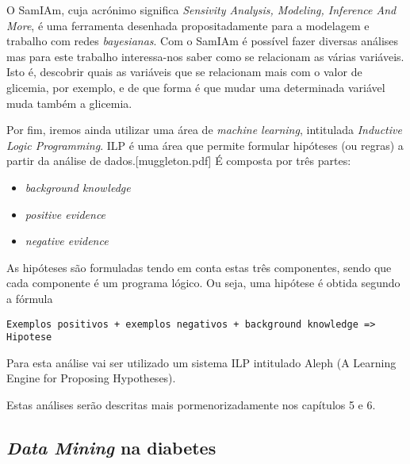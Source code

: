 O SamIAm, cuja acrónimo significa \textit{Sensivity Analysis, Modeling, Inference And More}, é uma ferramenta desenhada propositadamente para a modelagem e trabalho com redes \textit{bayesianas}. Com o SamIAm é possível fazer diversas análises mas para este trabalho interessa-nos saber como se relacionam as várias variáveis. Isto é, descobrir quais as variáveis que se relacionam mais com o valor de glicemia, por exemplo, e de que forma é que mudar uma determinada variável muda também a glicemia.

Por fim, iremos ainda utilizar uma área de \textit{machine learning}, intitulada \textit{Inductive Logic Programming}. ILP é uma área que permite formular hipóteses (ou regras) a partir da análise de dados.[muggleton.pdf] É composta por três partes:
\begin{itemize}
\item \textit{background knowledge}
\item \textit{positive evidence}
\item \textit{negative evidence}
\end{itemize}

As hipóteses são formuladas tendo em conta estas três componentes, sendo que cada componente é um programa lógico. Ou seja, uma hipótese é obtida segundo a fórmula

\begin{lstlisting}
Exemplos positivos + exemplos negativos + background knowledge => Hipotese
\end{lstlisting}
Para esta análise vai ser utilizado um sistema ILP intitulado Aleph (A Learning Engine for Proposing Hypotheses).

Estas análises serão descritas mais pormenorizadamente nos capítulos 5 e 6.

\subsection{\textit{Data Mining} na diabetes}

